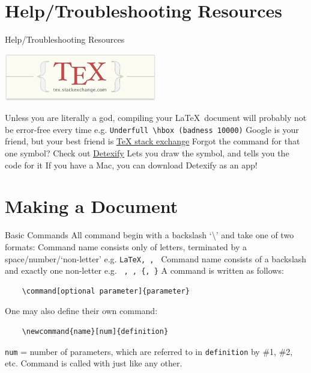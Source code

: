\documentclass[10pt]{beamer}
\begin{document}
\section{Help/Troubleshooting Resources}
\begin{frame}{Help/Troubleshooting Resources}

	\begin{center}
	\includegraphics[width=0.5\textwidth]{./figures/texstackexchange.png}
	\end{center}

	\bi Unless you are literally a god, compiling your \LaTeX \, document will probably not be error-free every time
	\bi e.g. \texttt{Underfull \textbackslash hbox (badness 10000)} \ei \ei
	\bi Google is your friend, but your best friend is
	\bi \href{https://tex.stackexchange.com/}{\underline{TeX stack exchange}} \ei \ei
	\bi Forgot the command for that one symbol? Check out \href{http://detexify.kirelabs.org/classify.html}{\underline{Detexify}}
	\bi Lets you draw the symbol, and tells you the code for it \ei
	\bi If you have a Mac, you can download Detexify as an app! \ei \ei
	
\end{frame}
	
\section{Making a Document}
\begin{frame}[fragile]{Basic Commands}
	\bi All command begin with a backslash `\textbackslash{}' and take one of two formats:
		\bi Command name consists \alert{only of letters}, terminated by a space/number/`non-letter' 
		\bi e.g. \texttt{\LaTeX, \hfill, \newline} \ei \ei
		\bi Command name consists of a \alert{backslash and exactly one non-letter}
		\bi e.g. \texttt{\,, \;, \{, \}}\ei \ei \ei
	\bi A command is written as follows: \ei
	\begin{verbatim}
	\command[optional parameter]{parameter}
	\end{verbatim}
	\bi One may also \alert{define their own command}:
	\begin{verbatim}
	\newcommand{name}[num]{definition}
	\end{verbatim}
	\bi \texttt{num} = number of parameters, which are referred to in \texttt{definition} by \#1, \#2, etc. Command is called with \texttt{\name} just like any other. \ei \ei
\end{frame}	
\end{document}
